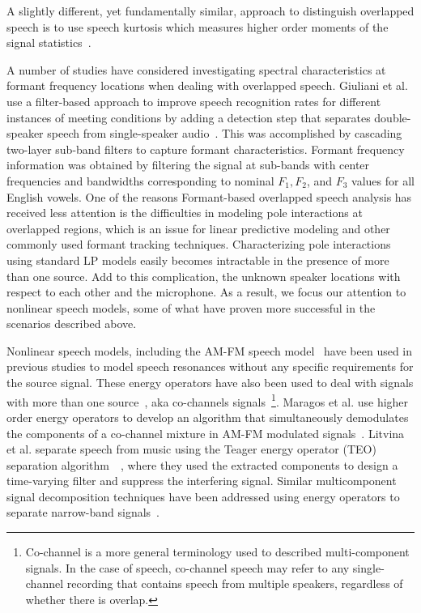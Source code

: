 A slightly different, yet fundamentally similar, approach to distinguish overlapped speech is to use speech kurtosis which measures higher order moments of the signal statistics~\cite{Wrigley_05}. 


A number of studies have considered investigating spectral characteristics at formant frequency locations when dealing with overlapped speech. 
Giuliani et al. use a filter-based approach to improve speech recognition rates for different instances of meeting conditions by adding a detection step that separates double-speaker speech from single-speaker audio~\cite{giuliani_meeting}. 
This was accomplished by cascading two-layer sub-band filters to capture formant characteristics. 
Formant frequency information was obtained by filtering the signal at sub-bands with center frequencies and bandwidths corresponding to nominal ${F_1, F_2}$, and ${F_3}$ values for all English vowels. 
One of the reasons Formant-based overlapped speech analysis has received less attention is the difficulties in modeling pole interactions at overlapped regions, which is an issue for linear predictive modeling and other commonly used formant tracking techniques. 
Characterizing pole interactions using standard LP models easily becomes intractable in the presence of more than one source. 
Add to this complication, the unknown speaker locations with respect to each other and the microphone. 
As a result, we focus our attention to nonlinear speech models, some of what have proven more successful in the scenarios described above. 

Nonlinear speech models, including the AM-FM speech model~\cite{maragos_kaiser_quatieri} have been used in previous studies to model speech resonances without any specific requirements for the source signal. 
These energy operators have also been used to deal with signals with more than one source~\cite{maragos_instantaneousenergy}, aka co-channels signals~\footnote{Co-channel is a more general terminology used to described multi-component signals. 
In the case of speech, co-channel speech may refer to any single-channel recording that contains speech from multiple speakers, regardless of whether there is overlap.}. 
Maragos et al. use higher order energy operators to develop an algorithm that simultaneously demodulates the components of a co-channel mixture in AM-FM modulated signals~\cite{maragos_instantaneousenergy}. 
Litvina et al. separate speech from music using the Teager energy operator (TEO) separation algorithm~\cite{maragos_kaiser_quatieri}~\cite{Litvin2010}, where they used the extracted components to design a time-varying filter and suppress the interfering signal. 
Similar multicomponent signal decomposition techniques have been addressed using energy operators to separate narrow-band signals~\cite{Linicassp95,hu12_nullspacepersuit,santhanam_maragos_2000}. 

